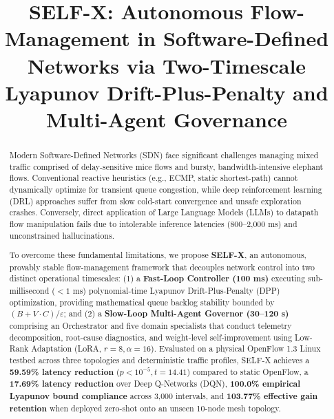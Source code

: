 \documentclass[conference]{IEEEtran}
\begin{document}
\title{SELF-X: Autonomous Flow-Management in Software-Defined Networks via Two-Timescale Lyapunov Drift-Plus-Penalty and Multi-Agent Governance}

\author{
}

\maketitle

\begin{abstract}
Modern Software-Defined Networks (SDN) face significant challenges managing mixed traffic comprised of delay-sensitive mice flows and bursty, bandwidth-intensive elephant flows. Conventional reactive heuristics (e.g., ECMP, static shortest-path) cannot dynamically optimize for transient queue congestion, while deep reinforcement learning (DRL) approaches suffer from slow cold-start convergence and unsafe exploration crashes. Conversely, direct application of Large Language Models (LLMs) to datapath flow manipulation fails due to intolerable inference latencies (800--2,000 ms) and unconstrained hallucinations.

To overcome these fundamental limitations, we propose \textbf{SELF-X}, an autonomous, provably stable flow-management framework that decouples network control into two distinct operational timescales: (1) a \textbf{Fast-Loop Controller (100 ms)} executing sub-millisecond ($<1$ ms) polynomial-time Lyapunov Drift-Plus-Penalty (DPP) optimization, providing mathematical queue backlog stability bounded by $(B + V \cdot C)/\varepsilon$; and (2) a \textbf{Slow-Loop Multi-Agent Governor (30--120 s)} comprising an Orchestrator and five domain specialists that conduct telemetry decomposition, root-cause diagnostics, and weight-level self-improvement using Low-Rank Adaptation (LoRA, $r=8, \alpha=16$). Evaluated on a physical OpenFlow 1.3 Linux testbed across three topologies and deterministic traffic profiles, SELF-X achieves a \textbf{59.59\% latency reduction} ($p < 10^{-5}, t = 14.41$) compared to static OpenFlow, a \textbf{17.69\% latency reduction} over Deep Q-Networks (DQN), \textbf{100.0\% empirical Lyapunov bound compliance} across 3,000 intervals, and \textbf{103.77\% effective gain retention} when deployed zero-shot onto an unseen 10-node mesh topology.
\end{abstract}
\end{document}
